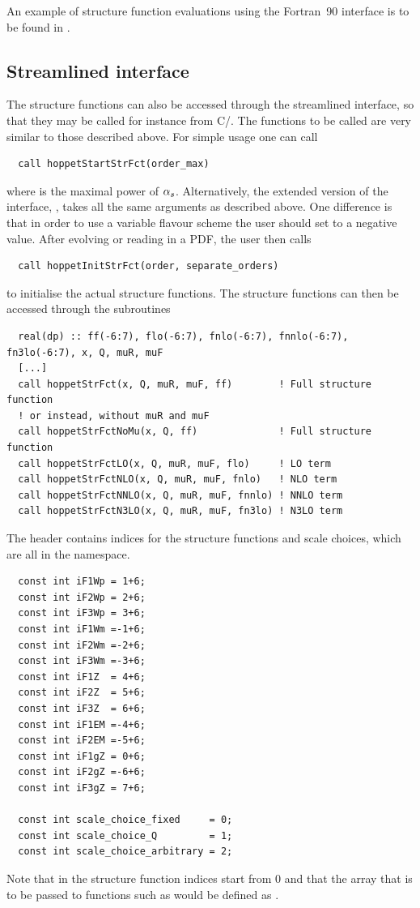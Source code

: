 An example of structure function evaluations using the Fortran~90
interface is to be found in
. 

\subsection{Streamlined interface}
\label{sec:structure-functions-streamlined}
The structure functions can also be accessed through the streamlined
interface, so that they may be called for instance from C/\CPP{}. The
functions to be called are very similar to those described above.
%
For simple usage one can call 
\begin{lstlisting}
  call hoppetStartStrFct(order_max)
\end{lstlisting}
where 
%
is the maximal
power of $\alpha_s$.
%
Alternatively, the extended version of the interface,
,  takes all the same arguments as
 described above. One difference is that in order to
use a variable flavour scheme the user should set  to a
negative value. After evolving or reading in a PDF, the user then calls
\begin{lstlisting}
  call hoppetInitStrFct(order, separate_orders)
\end{lstlisting}
to initialise the actual structure functions. The structure functions
can then be accessed through the subroutines
\begin{lstlisting}
  real(dp) :: ff(-6:7), flo(-6:7), fnlo(-6:7), fnnlo(-6:7), fn3lo(-6:7), x, Q, muR, muF
  [...]
  call hoppetStrFct(x, Q, muR, muF, ff)        ! Full structure function
  ! or instead, without muR and muF
  call hoppetStrFctNoMu(x, Q, ff)              ! Full structure function
  call hoppetStrFctLO(x, Q, muR, muF, flo)     ! LO term
  call hoppetStrFctNLO(x, Q, muR, muF, fnlo)   ! NLO term
  call hoppetStrFctNNLO(x, Q, muR, muF, fnnlo) ! NNLO term
  call hoppetStrFctN3LO(x, Q, muR, muF, fn3lo) ! N3LO term
\end{lstlisting}
The \CPP{} header contains indices for the structure functions and scale
choices, which are all in the  namespace.
%
\begin{lstlisting}
  const int iF1Wp = 1+6;
  const int iF2Wp = 2+6;
  const int iF3Wp = 3+6;
  const int iF1Wm =-1+6;
  const int iF2Wm =-2+6;
  const int iF3Wm =-3+6;
  const int iF1Z  = 4+6;
  const int iF2Z  = 5+6;
  const int iF3Z  = 6+6;
  const int iF1EM =-4+6;
  const int iF2EM =-5+6;
  const int iF1gZ = 0+6;
  const int iF2gZ =-6+6;
  const int iF3gZ = 7+6;

  const int scale_choice_fixed     = 0;
  const int scale_choice_Q         = 1;
  const int scale_choice_arbitrary = 2;
\end{lstlisting}
Note that in \CPP{} the structure function indices start from 0 and that the \CPP{}
array that is to be passed to functions such as 
would be defined as .

